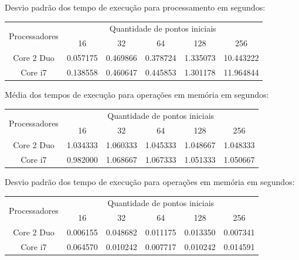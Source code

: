     \hspace{1mm}\newline
    
    \noindent Desvio padrão dos tempo de execução para processamento em segundos:\\
    \begin{tabular}{| c | c | c | c | c | c |}
      \hline
      \multirow{2}{*}{Processadores}& \multicolumn{5}{|c|}{Quantidade de pontos iniciais} \\ \cline{2-6}
      & 16 & 32 & 64 & 128 & 256 \\ \hline
      Core 2 Duo & 0.057175 & 0.469866 & 0.378724 & 1.335073 & 10.443222 \\ \hline
      Core i7 & 0.138558 & 0.460647 & 0.445853 & 1.301178 & 11.964844 \\ \hline

      \hline
    \end{tabular}
    
    \hspace{1mm}\newline
    
    \noindent Média dos tempos de execução para operações em memória em segundos:\\
    \begin{tabular}{| c | c | c | c | c | c |}
      \hline
      \multirow{2}{*}{Processadores}& \multicolumn{5}{|c|}{Quantidade de pontos iniciais} \\ \cline{2-6}
      & 16 & 32 & 64 & 128 & 256 \\ \hline
      Core 2 Duo & 1.034333 & 1.060333 & 1.045333 & 1.048667 & 1.048333 \\ \hline
      Core i7 & 0.982000 & 1.068667 & 1.067333 & 1.051333 & 1.050667\\ \hline

      \hline
    \end{tabular}
    
    \hspace{1mm}\newline
    
    \noindent Desvio padrão dos tempo de execução para operações em memória em segundos:\\
    \begin{tabular}{| c | c | c | c | c | c |}
      \hline
      \multirow{2}{*}{Processadores}& \multicolumn{5}{|c|}{Quantidade de pontos iniciais} \\ \cline{2-6}
      & 16 & 32 & 64 & 128 & 256 \\ \hline
      Core 2 Duo & 0.006155 & 0.048682 & 0.011175 & 0.013350 & 0.007341 \\ \hline
      Core i7 & 0.064570 & 0.010242 & 0.007717 & 0.010242 & 0.014591 \\ \hline

      \hline
    \end{tabular}

